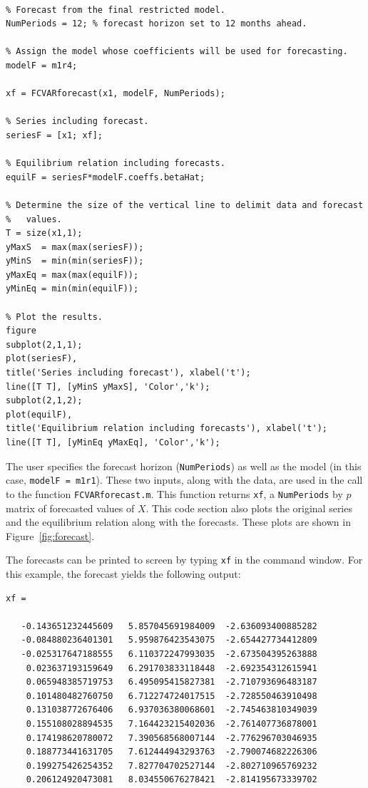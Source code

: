 \documentclass[10pt]{article}
\begin{document}
\begin{lstlisting}[frame=single,caption={Forecasting}, label = forecast]
%% --------- FORECAST ---------- %

% Forecast from the final restricted model.
NumPeriods = 12; % forecast horizon set to 12 months ahead.

% Assign the model whose coefficients will be used for forecasting.
modelF = m1r4;

xf = FCVARforecast(x1, modelF, NumPeriods);

% Series including forecast.
seriesF = [x1; xf]; 

% Equilibrium relation including forecasts.
equilF = seriesF*modelF.coeffs.betaHat; 

% Determine the size of the vertical line to delimit data and forecast
%   values.
T = size(x1,1);
yMaxS  = max(max(seriesF));
yMinS  = min(min(seriesF));
yMaxEq = max(max(equilF));
yMinEq = min(min(equilF));

% Plot the results.
figure
subplot(2,1,1);
plot(seriesF), 
title('Series including forecast'), xlabel('t');
line([T T], [yMinS yMaxS], 'Color','k');
subplot(2,1,2);
plot(equilF), 
title('Equilibrium relation including forecasts'), xlabel('t');
line([T T], [yMinEq yMaxEq], 'Color','k');
\end{lstlisting}

The user specifies the forecast horizon (\verb|NumPeriods|) as well as the model (in this case, \verb|modelF = m1r1|). These two inputs, along with the data, are used in the call to the function \verb|FCVARforecast.m|. This function returns \verb|xf|, a \verb|NumPeriods| by $p$ matrix of forecasted values of $X$. This code section also plots the original series and the equilibrium relation along with the forecasts. These plots are shown in Figure~\ref{fig:forecast}.

The forecasts can be printed to screen by typing \verb|xf| in the command window. For this example, the forecast yields the following output:
\begin{verbatim}
xf =

   -0.143651232445609   5.857045691984009  -2.636093400885282
   -0.084880236401301   5.959876423543075  -2.654427734412809
   -0.025317647188555   6.110372247993035  -2.673504395263888
    0.023637193159649   6.291703833118448  -2.692354312615941
    0.065948385719753   6.495095415827381  -2.710793696483187
    0.101480482760750   6.712274724017515  -2.728550463910498
    0.131038772676406   6.937036380068601  -2.745463810349039
    0.155108028894535   7.164423215402036  -2.761407736878001
    0.174198620780072   7.390568568007144  -2.776296703046935
    0.188773441631705   7.612444943293763  -2.790074682226306
    0.199275426254352   7.827704702527144  -2.802710965769232
    0.206124920473081   8.034550676278421  -2.814195673339702
\end{verbatim}
\end{document}
